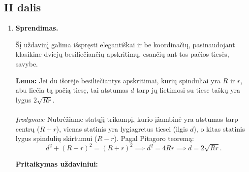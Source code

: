\documentclass[11pt,a4paper]{article}
\begin{document}
\subsection*{II dalis}
\begin{enumerate}
    \item \textbf{Sprendimas.}
    
    Šį uždavinį galima išspręsti elegantiškai ir be koordinačių, pasinaudojant klasikine dviejų besiliečiančių apskritimų, esančių ant tos pačios tiesės, savybe.
    
    \textbf{Lema:} Jei du išorėje besiliečiantys apskritimai, kurių spinduliai yra $R$ ir $r$, abu liečia tą pačią tiesę, tai atstumas $d$ tarp jų lietimosi su tiese taškų yra lygus $2\sqrt{Rr}$.\\ \\
    \textit{Įrodymas:} Nubrėžiame statųjį trikampį, kurio įžambinė yra atstumas tarp centrų ($R+r$), vienas statinis yra lygiagretus tiesei (ilgis $d$), o kitas statinis lygus spindulių skirtumui ($R-r$). Pagal Pitagoro teoremą: 
    \[ d^2 + (R-r)^2 = (R+r)^2 \implies d^2 = 4Rr \implies d = 2\sqrt{Rr}. \]

    \textbf{Pritaikymas uždaviniui:}
    \begin{center}
    \end{center}


\end{enumerate}
\end{document}
